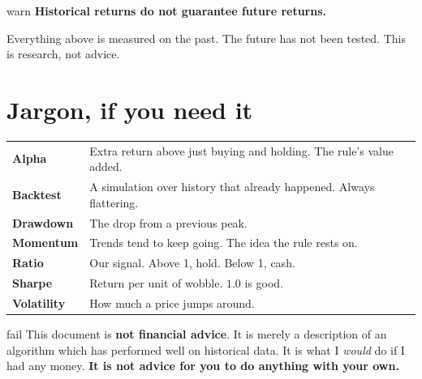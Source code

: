 \documentclass[12pt,a4paper]{article}
\begin{document}
\vspace{1em}

\begin{kbox}[]{warn}
\centering
\large\bfseries Historical returns do not guarantee future returns.

\vspace{0.4em}
\normalsize\normalfont
Everything above is measured on the past. The future has not been
tested. This is research, not advice.
\end{kbox}

\vspace{0.3em}

\enlargethispage{4\baselineskip}
\section*{\normalsize Jargon, if you need it}

{\footnotesize
\setlength{\tabcolsep}{4pt}
\begin{tabular}{@{}lp{11.7cm}@{}}
    \textbf{Alpha}      & Extra return above just buying and holding. The rule's value added. \\
    \textbf{Backtest}   & A simulation over history that already happened. Always flattering. \\
    \textbf{Drawdown}   & The drop from a previous peak. \\
    \textbf{Momentum}   & Trends tend to keep going. The idea the rule rests on. \\
    \textbf{Ratio}      & Our signal. Above 1, hold. Below 1, cash. \\
    \textbf{Sharpe}     & Return per unit of wobble. $1.0$ is good. \\
    \textbf{Volatility} & How much a price jumps around. \\
\end{tabular}
}

\vspace{0.4em}

\begin{kbox}{fail}
\color{red}
This document is \textbf{not financial advice}. It is merely a
description of an algorithm which has performed well on historical
data. It is what I \emph{would} do if I had any money.
\textbf{It is not advice for you to do anything with your own.}
\end{kbox}
\end{document}
